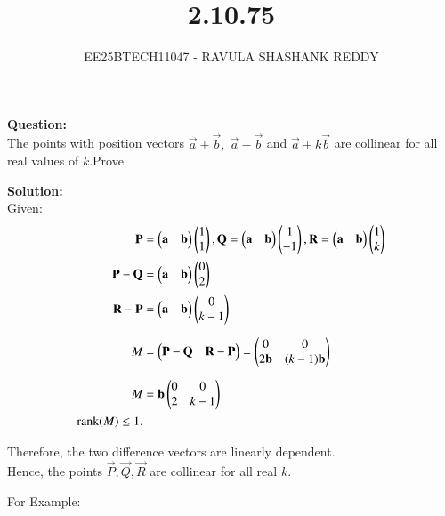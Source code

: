 \documentclass[journal]{article}
\begin{document}
	
	
	\vspace{3cm}
	
\title{2.10.75}
\author{EE25BTECH11047 - RAVULA SHASHANK REDDY}
\maketitle
\hrulefill
\bigskip 

\renewcommand{\thetable}{\theenumi}
\setlength{\intextsep}{10pt}

\textbf{Question:} \\

The points with position vectors $\vec{a}+\vec{b},\;\vec{a}-\vec{b}$ and $\vec{a}+k\vec{b}$ are collinear for all real values of   $k$.Prove

\textbf{Solution:}\\

Given:
\begin{align}
    \mathbf{P} &= \begin{pmatrix}\mathbf{a}&\mathbf{b}\end{pmatrix}\begin{pmatrix}1\\1\end{pmatrix},\mathbf{Q}=\begin{pmatrix}\mathbf{a}&\mathbf{b}\end{pmatrix}\begin{pmatrix}1\\-1\end{pmatrix},\mathbf{R} =\begin{pmatrix}\mathbf{a}&\mathbf{b}\end{pmatrix}\begin{pmatrix}1\\k\end{pmatrix} \\
    \mathbf{P}-\mathbf{Q} &=\begin{pmatrix}\mathbf{a}&\mathbf{b}\end{pmatrix}\begin{pmatrix}0\\2\end{pmatrix} \\ 
    \mathbf{R}-\mathbf{P} &= \begin{pmatrix}\mathbf{a}&\mathbf{b}\end{pmatrix}\begin{pmatrix}0\\k-1\end{pmatrix}\\[6pt]
    M &= \begin{pmatrix} \mathbf{P}-\mathbf{Q} & \mathbf{R}-\mathbf{P} \end{pmatrix} 
       = \begin{pmatrix} 0 & 0\\2\mathbf{b} & (k-1)\mathbf{b} \end{pmatrix} \\[6pt]
      M& = \mathbf{b} \begin{pmatrix}0&0\\2 & k-1\end{pmatrix}\\
\text{rank}(M) \leq 1.
\end{align}
\begin{center}
Therefore, the two difference vectors are linearly dependent. \\ 

Hence, the points $\vec{P}, \vec{Q}, \vec{R}$ are collinear for all real $k$.
\end{center}

For Example:\\
\end{document}
